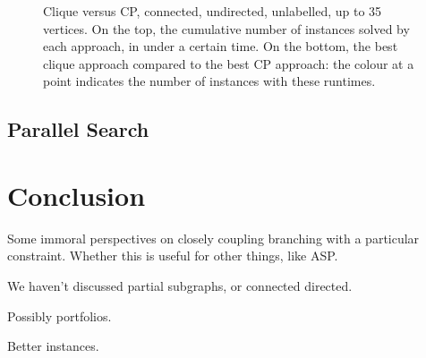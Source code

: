 \documentclass{llncs}
\begin{document}
\begin{figure}[p]
    \centering
    
    \caption{Clique versus CP, connected, undirected, unlabelled, up to 35 vertices. On the top, the
    cumulative number of instances solved by each approach, in under a certain time. On the bottom,
    the best clique approach compared to the best CP approach: the colour at a point indicates the
    number of instances with these runtimes.}
\label{figure:connected-plain}
\end{figure}

\subsection{Parallel Search}

\cite{DBLP:conf/ictai/MinotNS15}

\section{Conclusion}

Some immoral perspectives on closely coupling branching with a particular constraint. Whether this
is useful for other things, like ASP.

We haven't discussed partial subgraphs, or connected directed.

Possibly portfolios.

Better instances.

\FloatBarrier



\end{document}
